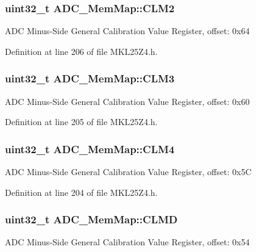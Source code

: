 \subsubsection[{\texorpdfstring{C\+L\+M2}{CLM2}}]{\setlength{\rightskip}{0pt plus 5cm}uint32\+\_\+t A\+D\+C\+\_\+\+Mem\+Map\+::\+C\+L\+M2}\hypertarget{struct_a_d_c___mem_map_a2794a4dac3b6ec18535eeae7c7e2d4e3}{}\label{struct_a_d_c___mem_map_a2794a4dac3b6ec18535eeae7c7e2d4e3}
A\+DC Minus-\/\+Side General Calibration Value Register, offset\+: 0x64 

Definition at line 206 of file M\+K\+L25\+Z4.\+h.

\subsubsection[{\texorpdfstring{C\+L\+M3}{CLM3}}]{\setlength{\rightskip}{0pt plus 5cm}uint32\+\_\+t A\+D\+C\+\_\+\+Mem\+Map\+::\+C\+L\+M3}\hypertarget{struct_a_d_c___mem_map_a326c171566746f11f9b808930253df85}{}\label{struct_a_d_c___mem_map_a326c171566746f11f9b808930253df85}
A\+DC Minus-\/\+Side General Calibration Value Register, offset\+: 0x60 

Definition at line 205 of file M\+K\+L25\+Z4.\+h.

\subsubsection[{\texorpdfstring{C\+L\+M4}{CLM4}}]{\setlength{\rightskip}{0pt plus 5cm}uint32\+\_\+t A\+D\+C\+\_\+\+Mem\+Map\+::\+C\+L\+M4}\hypertarget{struct_a_d_c___mem_map_a7b8d8ae0f052a3824d3b34dffdf471e0}{}\label{struct_a_d_c___mem_map_a7b8d8ae0f052a3824d3b34dffdf471e0}
A\+DC Minus-\/\+Side General Calibration Value Register, offset\+: 0x5C 

Definition at line 204 of file M\+K\+L25\+Z4.\+h.

\subsubsection[{\texorpdfstring{C\+L\+MD}{CLMD}}]{\setlength{\rightskip}{0pt plus 5cm}uint32\+\_\+t A\+D\+C\+\_\+\+Mem\+Map\+::\+C\+L\+MD}\hypertarget{struct_a_d_c___mem_map_ad78aef04412250c47f943c007ad2eed2}{}\label{struct_a_d_c___mem_map_ad78aef04412250c47f943c007ad2eed2}
A\+DC Minus-\/\+Side General Calibration Value Register, offset\+: 0x54 

